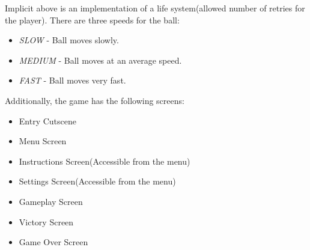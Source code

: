 \documentclass[a4paper,12pt,oneside]{book}
\begin{document}
Implicit above is an implementation of a life system(allowed number of retries for the player). There are three speeds for the ball:
\begin{itemize}
  \item \textit{SLOW} - Ball moves slowly.
  \item \textit{MEDIUM} - Ball moves at an average speed.
  \item \textit{FAST} - Ball moves very fast.
\end{itemize}
Additionally, the game has the following screens:
\begin{itemize}
  \item Entry Cutscene
  \item Menu Screen
  \item Instructions Screen(Accessible from the menu)
  \item Settings Screen(Accessible from the menu)
  \item Gameplay Screen
  \item Victory Screen
  \item Game Over Screen
\end{itemize}
\end{document}
